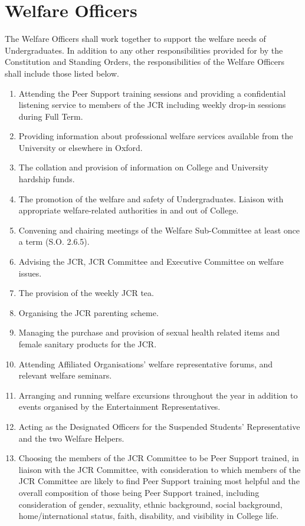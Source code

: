 \section{Welfare Officers}
\npara The Welfare Officers shall work together to support the welfare needs of Undergraduates.
\npara In addition to any other responsibilities provided for by the Constitution and Standing Orders, the responsibilities of the Welfare Officers shall include those listed below.
\begin{enumerate}
	\item Attending the Peer Support training sessions and providing a confidential listening service to members of the JCR including weekly drop-in sessions during Full Term.     
	\item Providing information about professional welfare services available from the University or elsewhere in Oxford.     
	\item The collation and provision of information on College and University hardship funds.     
	\item The promotion of the welfare and safety of Undergraduates.     
	Liaison with appropriate welfare-related authorities in and out of College.     
	\item Convening and chairing meetings of the Welfare Sub-Committee at least once a term (S.O. 2.6.5).     
	\item Advising the JCR, JCR Committee and Executive Committee on welfare issues.     
	\item The provision of the weekly JCR tea.     
	\item Organising the JCR parenting scheme.
	\item Managing the purchase and provision of sexual health related items and female sanitary products for the JCR.
	\item Attending Affiliated Organisations' welfare representative forums, and relevant welfare seminars.
	\item Arranging and running welfare excursions throughout the year in addition to events organised by the Entertainment Representatives.
	\item Acting as the Designated Officers for the Suspended Students’ Representative and the two Welfare Helpers.
	\item Choosing the members of the JCR Committee to be Peer Support trained, in liaison with the JCR Committee, with consideration to which members of the JCR Committee are likely to find Peer Support training most helpful and the overall composition of those being Peer Support trained, including consideration of gender, sexuality, ethnic background, social background,  home/international status, faith, disability, and visibility in College life.
\end{enumerate}
